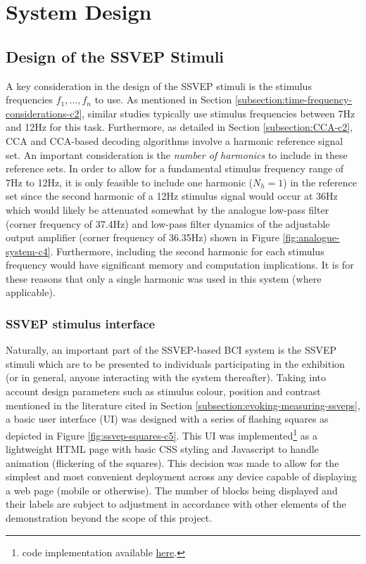 \chapter{System Design}
\label{chapter:system-design}

\graphicspath{ {report/C5 System Design/assets/} } 

\section{Design of the SSVEP Stimuli}
\label{subsection:ssvep-stimuli}
A key consideration in the design of the SSVEP stimuli is the stimulus frequencies $f_1, \dots, f_n$ to use. As mentioned in Section \ref{subsection:time-frequency-considerations-c2}, similar studies typically use stimulus frequencies between 7Hz and 12Hz for this task. Furthermore, as detailed in Section \ref{subsection:CCA-c2}, CCA and CCA-based decoding algorithms involve a harmonic reference signal set. An important consideration is the \textit{number of harmonics} to include in these reference sets. In order to allow for a fundamental stimulus frequency range of 7Hz to 12Hz, it is only feasible to include one harmonic ($N_h=1$) in the reference set since the second harmonic of a 12Hz stimulus signal would occur at 36Hz which would likely be attenuated somewhat by the analogue low-pass filter (corner frequency of 37.4Hz) and low-pass filter dynamics of the adjustable output amplifier (corner frequency of 36.35Hz) shown in Figure \ref{fig:analogue-system-c4}. Furthermore, including the second harmonic for each stimulus frequency would have significant memory and computation implications. It is for these reasons that only a single harmonic was used in this system (where applicable).

\subsection{SSVEP stimulus interface}

Naturally, an important part of the SSVEP-based BCI system is the SSVEP stimuli which are to be presented to individuals participating in the exhibition (or in general, anyone interacting with the system thereafter). Taking into account design parameters such as stimulus colour, position and contrast mentioned in the literature cited in Section \ref{subsection:evoking-measuring-ssveps}, a basic user interface (UI) was designed with a series of flashing squares as depicted in Figure \ref{fig:ssvep-squares-c5}. This UI was implemented\footnote{code implementation available \href{https://github.com/JamesTev/EEG-decoding/blob/master/ui/ssvep_squares.html}{here}.} as a lightweight HTML page with basic CSS styling and Javascript to handle animation (flickering of the squares). This decision was made to allow for the simplest and most convenient deployment across any device capable of displaying a web page (mobile or otherwise). The number of blocks being displayed and their labels are subject to adjustment in accordance with other elements of the demonstration beyond the scope of this project.

